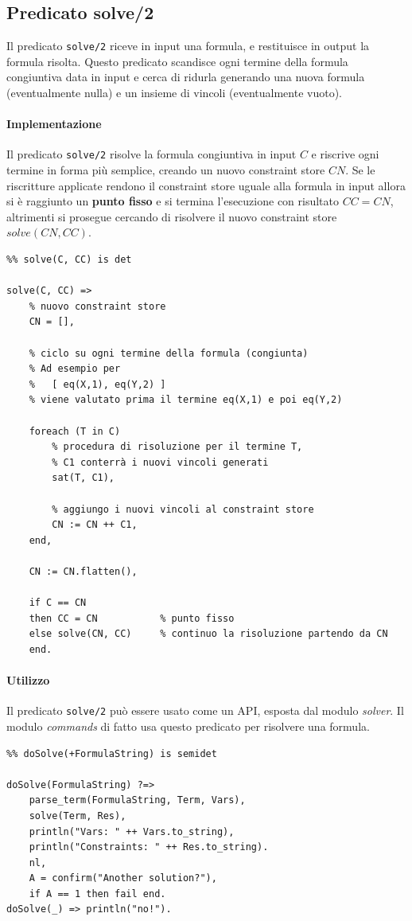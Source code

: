 \documentclass[12pt,a4paper,openright]{book} %
\begin{document}
\subsection{Predicato solve/2}
\label{subsec:lsetpicat_solver_solve2}

Il predicato \verb|solve/2| riceve in input una formula, e restituisce
in output la formula risolta. Questo predicato scandisce ogni termine
della formula congiuntiva data in input e cerca di ridurla generando
una nuova formula (eventualmente nulla) e un insieme di vincoli
(eventualmente vuoto).

\paragraph{Implementazione}

Il predicato \verb|solve/2| risolve la formula congiuntiva in input
$C$ e riscrive ogni termine in forma più semplice, creando un nuovo
constraint store $CN$. Se le riscritture applicate rendono il
constraint store uguale alla formula in input allora si è raggiunto un
\textbf{punto fisso} e si termina l'esecuzione con risultato $CC =
CN$, altrimenti si prosegue cercando di risolvere il nuovo constraint
store $solve(CN, CC)$.

\begin{verbatim}
%% solve(C, CC) is det

solve(C, CC) =>
    % nuovo constraint store
    CN = [],
    
    % ciclo su ogni termine della formula (congiunta)
    % Ad esempio per
    %   [ eq(X,1), eq(Y,2) ]
    % viene valutato prima il termine eq(X,1) e poi eq(Y,2)

    foreach (T in C)
        % procedura di risoluzione per il termine T,
        % C1 conterrà i nuovi vincoli generati
        sat(T, C1),

        % aggiungo i nuovi vincoli al constraint store
        CN := CN ++ C1,
    end,
    
    CN := CN.flatten(),

    if C == CN
    then CC = CN           % punto fisso
    else solve(CN, CC)     % continuo la risoluzione partendo da CN
    end.
\end{verbatim}

\paragraph{Utilizzo}
Il predicato \verb|solve/2| può essere usato come un API, esposta dal
modulo \emph{solver}. Il modulo \emph{commands} di fatto usa questo
predicato per risolvere una formula.
\begin{verbatim}
%% doSolve(+FormulaString) is semidet

doSolve(FormulaString) ?=>
    parse_term(FormulaString, Term, Vars),
    solve(Term, Res),
    println("Vars: " ++ Vars.to_string),
    println("Constraints: " ++ Res.to_string).
    nl,
    A = confirm("Another solution?"),
    if A == 1 then fail end.
doSolve(_) => println("no!").
\end{verbatim}
\end{document}
